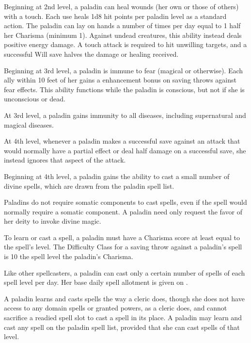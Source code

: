  Beginning at 2nd level, a paladin can heal wounds (her own or those of others) with a touch. Each use heals 1d8 hit points per paladin level as a standard action. The paladin can lay on hands a number of times per day equal to 1 \add half her Charisma (minimum 1). Against undead creatures, this ability instead deals positive energy damage. A touch attack is required to hit unwilling targets, and a successful Will save halves the damage or healing received.

  Beginning at 3rd level, a paladin is immune to fear (magical or otherwise). Each ally within 10 feet of her gains a  enhancement bonus on saving throws against fear effects. This ability functions while the paladin is conscious, but not if she is unconscious or dead.

 At 3rd level, a paladin gains immunity to all diseases, including supernatural and magical diseases.

 At 4th level, whenever a paladin makes a successful save against an attack that would normally have a partial effect or deal half damage on a successful save, she instead ignores that aspect of the attack.

 Beginning at 4th level, a paladin gains the ability to cast a small number of divine spells, which are drawn from the paladin spell list.

Paladins do not require somatic components to cast spells, even if the spell would normally require a somatic component. A paladin need only request the favor of her deity to invoke divine magic.

\par To learn or cast a spell, a paladin must have a Charisma score at least equal to the spell's level. The Difficulty Class for a saving throw against a paladin's spell is 10 \add the spell level \add the paladin's Charisma.

\par Like other spellcasters, a paladin can cast only a certain number of spells of each spell level per day. Her base daily spell allotment is given on .

A paladin learns and casts spells the way a cleric does, though she does not have access to any domain spells or granted powers, as a cleric does, and cannot sacrifice a readied spell slot to cast a  spell in its place. A paladin may learn and cast any spell on the paladin spell list, provided that she can cast spells of that level.

